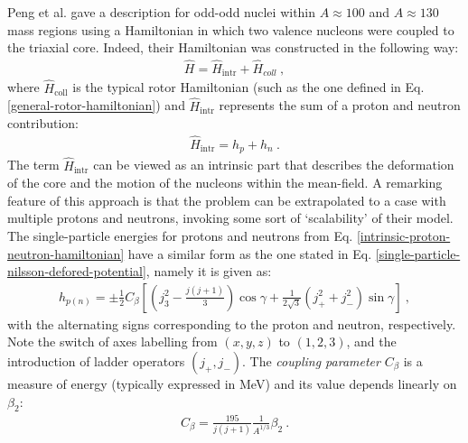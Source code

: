 Peng et al. \cite{peng2003description} gave a description for odd-odd nuclei within $A\approx 100$ and $A\approx 130$ mass regions using a Hamiltonian in which two valence nucleons were coupled to the triaxial core. Indeed, their Hamiltonian was constructed in the following way:
\begin{align}
    \hat{H}=\hat{H}_\text{intr}+\hat{H}_{coll}\ ,
\end{align}
where $\hat{H}_\text{coll}$ is the typical rotor Hamiltonian (such as the one defined in Eq. \eqref{general-rotor-hamiltonian}) and $\hat{H}_\text{intr}$ represents the sum of a proton and neutron contribution:
\begin{align}
    \hat{H}_\text{intr}=h_p+h_n\ .
    \label{intrinsic-proton-neutron-hamiltonian}
\end{align}
The term $\hat{H}_\text{intr}$ can be viewed as an intrinsic part that describes the deformation of the core and the motion of the nucleons within the mean-field. A remarking feature of this approach is that the problem can be extrapolated to a case with multiple protons and neutrons, invoking some sort of `scalability' of their model. The single-particle energies for protons and neutrons from Eq. \eqref{intrinsic-proton-neutron-hamiltonian} have a similar form as the one stated in Eq. \eqref{single-particle-nilsson-defored-potential}, namely it is given as:
\begin{align}
    h_{p(n)}=\pm\frac{1}{2}C_\beta\left[\left(j_3^2-\frac{j(j+1)}{3}\right)\cos\gamma+\frac{1}{2\sqrt{3}}(j_+^2+j_-^2)\sin\gamma\right]\ ,
    \label{single-particle-energies-hpn}
\end{align}
with the alternating signs corresponding to the proton and neutron, respectively. Note the switch of axes labelling from $(x,y,z)$ to $(1,2,3)$, and the introduction of ladder operators $(j_+,j_-)$. The \emph{coupling parameter} $C_\beta$ is a measure of energy (typically expressed in MeV) and its value depends linearly on $\beta_2$:
\begin{align}
    C_\beta=\frac{195}{j(j+1)}\frac{1}{A^{1/3}}\beta_2\ .
\end{align}

